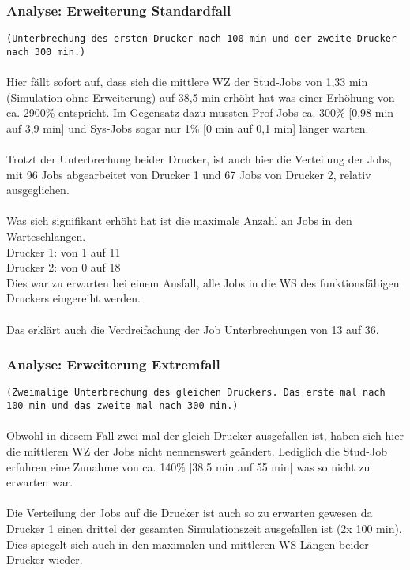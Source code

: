 \documentclass[12pt,a4paper]{article}
\begin{document}
	
	\subsubsection{Analyse: Erweiterung Standardfall}
	\texttt{(Unterbrechung des ersten Drucker nach 100 min und der zweite Drucker nach 300 min.)}
	   \\ \\
	Hier fällt sofort auf, dass sich die mittlere WZ der Stud-Jobs von 1,33 min (Simulation ohne Erweiterung)  auf 38,5 min erhöht hat was einer Erhöhung von ca. 2900\% entspricht. Im Gegensatz dazu
	 mussten Prof-Jobs ca. 300\% 
	[0,98 min auf 3,9 min] und Sys-Jobs sogar nur 1\% [0 min auf 0,1 min] länger warten.\\
	\\
	Trotzt der Unterbrechung beider Drucker, ist auch hier die Verteilung der Jobs, mit 96 Jobs abgearbeitet von Drucker 1 und 67 Jobs von Drucker 2, relativ ausgeglichen.\\
	\\
	Was sich signifikant erhöht hat ist die maximale Anzahl an Jobs in den Warteschlangen. \\
	Drucker 1: von 1 auf 11\\
	Drucker 2: von 0 auf 18\\
	Dies war zu erwarten bei einem Ausfall, alle Jobs in die WS des funktionsfähigen Druckers eingereiht werden.\\
	\\
	Das erklärt auch die Verdreifachung der Job Unterbrechungen von 13 auf 36.
	
	\subsubsection{Analyse: Erweiterung Extremfall}
	\texttt{(Zweimalige Unterbrechung des gleichen Druckers. Das erste mal nach 100 min und das zweite mal nach 300 min.)}
	\\ \\
	Obwohl in diesem Fall zwei mal der gleich Drucker ausgefallen ist, haben sich hier die mittleren WZ der Jobs nicht nennenswert geändert. Lediglich die Stud-Job erfuhren eine Zunahme von ca. 140\%
	 [38,5 min auf 55 min] was so nicht zu erwarten war.\\
	\\
	Die Verteilung der Jobs auf die Drucker ist auch so zu erwarten gewesen da Drucker 1 einen drittel der gesamten Simulationszeit ausgefallen ist (2x 100 min). Dies spiegelt sich auch in den maximalen und
	 mittleren WS Längen beider Drucker wieder.
	 
\end{document}
